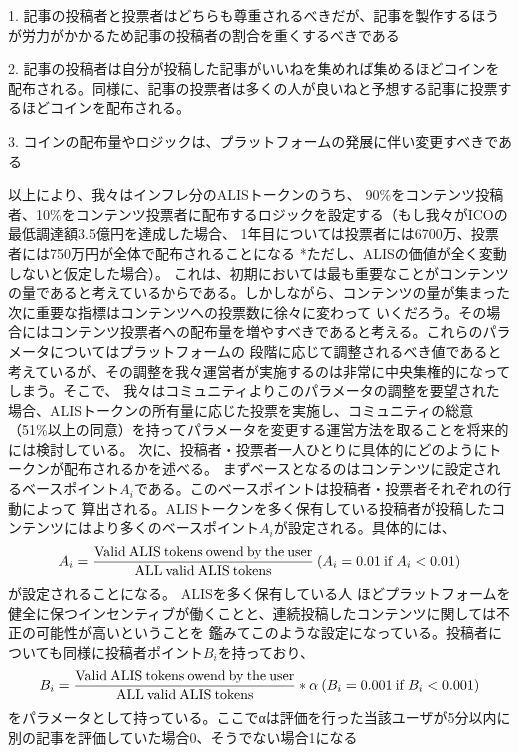 \documentclass{jsarticle}
\begin{document}
1. 記事の投稿者と投票者はどちらも尊重されるべきだが、記事を製作するほうが労力がかかるため記事の投稿者の割合を重くするべきである 

2. 記事の投稿者は自分が投稿した記事がいいねを集めれば集めるほどコインを配布される。同様に、記事の投票者は多くの人が良いねと予想する記事に投票するほどコインを配布される。 

3. コインの配布量やロジックは、プラットフォームの発展に伴い変更すべきである 

以上により、我々はインフレ分のALISトークンのうち、
90\%をコンテンツ投稿者、10\%をコンテンツ投票者に配布するロジックを設定する（もし我々がICOの最低調達額3.5億円を達成した場合、
1年目については投票者には6700万、投票者には750万円が全体で配布されることになる *ただし、ALISの価値が全く変動しないと仮定した場合）。
これは、初期においては最も重要なことがコンテンツの量であると考えているからである。しかしながら、コンテンツの量が集まった次に重要な指標はコンテンツへの投票数に徐々に変わって
いくだろう。その場合にはコンテンツ投票者への配布量を増やすべきであると考える。これらのパラメータについてはプラットフォームの
段階に応じて調整されるべき値であると考えているが、その調整を我々運営者が実施するのは非常に中央集権的になってしまう。そこで、
我々はコミュニティよりこのパラメータの調整を要望された場合、ALISトークンの所有量に応じた投票を実施し、コミュニティの総意
（51\%以上の同意）を持ってパラメータを変更する運営方法を取ることを将来的には検討している。
次に、投稿者・投票者一人ひとりに具体的にどのようにトークンが配布されるかを述べる。
まずベースとなるのはコンテンツに設定されるベースポイント$A_{i}$である。このベースポイントは投稿者・投票者それぞれの行動によって
算出される。ALISトークンを多く保有している投稿者が投稿したコンテンツにはより多くのベースポイント$A_{i}$が設定される。具体的には、
\begin{align}
A_{i} = \frac{\rm Valid\:ALIS\:tokens\:owend\:by\:the\:user}{\rm ALL\:valid\:ALIS\:tokens}\:(A_{i} = 0.01\:{\rm if}\:A_{i} < 0.01)
\end{align}
が設定されることになる。 ALISを多く保有している人
ほどプラットフォームを健全に保つインセンティブが働くことと、連続投稿したコンテンツに関しては不正の可能性が高いということを
鑑みてこのような設定になっている。投稿者についても同様に投稿者ポイント$B_{i}$を持っており、
\begin{align}
B_{i} = \frac{\rm Valid\:ALIS\:tokens\:owend\:by\:the\:user}{\rm ALL\:valid\:ALIS\:tokens} * \alpha \:(B_{i} = 0.001 {\rm\:if\:} B_{i} < 0.001)
\end{align}
をパラメータとして持っている。ここでαは評価を行った当該ユーザが5分以内に別の記事を評価していた場合0、そうでない場合1になる
\end{document}
